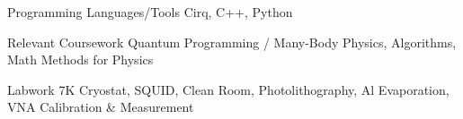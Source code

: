 


\begin{cvskills}

  \cvskill
    {Programming Languages/Tools}
    {Cirq, C++, Python}


  \cvskill 
    {Relevant Coursework}
    {Quantum Programming / Many-Body Physics, Algorithms, Math Methods for Physics}

  \cvskill
    {Labwork}
    {7K Cryostat, SQUID, Clean Room, Photolithography, Al Evaporation, VNA Calibration \& Measurement}


\end{cvskills}
